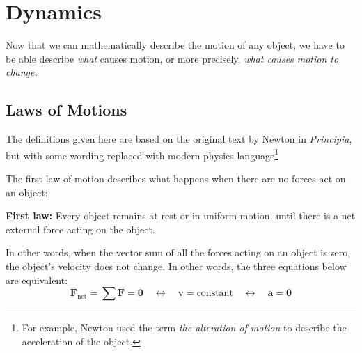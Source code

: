 
\chapter{Dynamics}
\label{chapter:dynamics}


Now that we can mathematically describe the motion of any object, we have to
be able describe \emph{what} causes motion, or more precisely,
\emph{what causes motion to change.}




\section{Laws of Motions}
The definitions given here are based on the original text by Newton in
\emph{Principia}, but with some wording replaced with modern physics
language\footnote{For example, Newton used the term \emph{the alteration of
motion} to describe the acceleration of the object.}

The first law of motion describes what happens when there are no forces act on
an object:
\begin{definition}
  \textbf{First law:} Every object remains at rest or in uniform motion, until
  there is a net external force acting on the object.
\end{definition}
In other words, when the vector sum of all the forces acting on an object is
zero, the object's velocity does not change. In other words, the three equations
below are equivalent:
\begin{equation*}
  \bm F_\text{net}=\sum\bm F=\bm 0
  \quad\longleftrightarrow\quad
  \bm v=\text{constant}
  \quad\longleftrightarrow\quad
  \bm a=\bm 0
\end{equation*}

